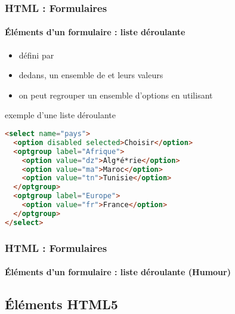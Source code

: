 \documentclass[xcolor=table]{beamer}
\begin{document}
\begin{frame}[fragile]
\frametitle{HTML : Formulaires}
\framesubtitle{Éléments d'un formulaire : liste déroulante}

\begin{itemize}
	\item {} défini par 
	\item dedans, un ensemble de  et leurs valeurs 
	\item on peut regrouper un ensemble d'options en utilisant 
\end{itemize}

\begin{exampleblock}{exemple d'une liste déroulante}
\lstset{escapeinside=**}
\scriptsize\bfseries\vspace{-6pt}
\begin{lstlisting}[language={html}]
<select name="pays">
  <option disabled selected>Choisir</option>
  <optgroup label="Afrique">
    <option value="dz">Alg*é*rie</option>
    <option value="ma">Maroc</option>
    <option value="tn">Tunisie</option>
  </optgroup>
  <optgroup label="Europe">
    <option value="fr">France</option>
  </optgroup>
</select>
\end{lstlisting}\vspace{-6pt}
\end{exampleblock}

\end{frame}

\begin{frame}[fragile]
\frametitle{HTML : Formulaires}
\framesubtitle{Éléments d'un formulaire : liste déroulante (Humour)}


\end{frame}

\subsection{Éléments HTML5}
\end{document}

